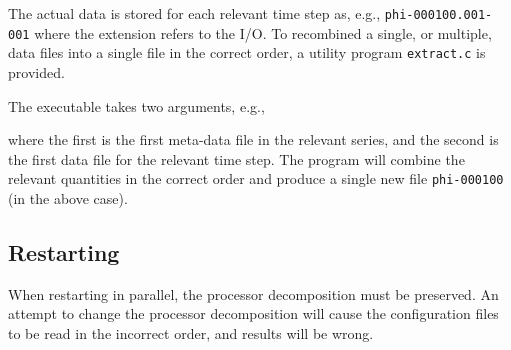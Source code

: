 The actual data is stored for each relevant time step as, e.g.,
\texttt{phi-000100.001-001} where the extension refers to the
I/O. To recombined a single, or multiple, data files into a
single file in the correct order, a utility program
\texttt{extract.c} is provided.

The executable takes two arguments, e.g.,


where  the first is the first meta-data file in the relevant series,
and the second is the first data file for the relevant time step. The
program will combine the relevant quantities in the correct order
and produce a single new file \texttt{phi-000100} (in the above case).

\subsection{Restarting}

When restarting in parallel, the processor decomposition must be
preserved. An attempt to change the processor decomposition will
cause the configuration files to be read in the incorrect order,
and results will be wrong.


